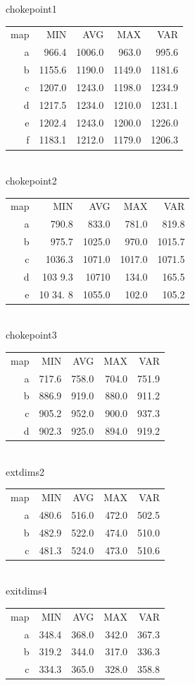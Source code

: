 \documentclass[12pt,letterpaper]{article}
\begin{document}
chokepoint1
\begin{tabular}{ r | r | r | r | r }
map & MIN  & AVG    & MAX    & VAR    \\
a &  966.4 & 1006.0 &  963.0 &  995.6 \\
b & 1155.6 & 1190.0 & 1149.0 & 1181.6 \\
c & 1207.0 & 1243.0 & 1198.0 & 1234.9 \\
d & 1217.5 & 1234.0 & 1210.0 & 1231.1 \\
e & 1202.4 & 1243.0 & 1200.0 & 1226.0 \\
f & 1183.1 & 1212.0 & 1179.0 & 1206.3 \\
\end{tabular}
\\
chokepoint2
\begin{tabular}{ r | r | r | r | r }
map & MIN  & AVG    & MAX    & VAR    \\
a &  790.8 &  833.0 &  781.0 &  819.8 \\
b &  975.7 & 1025.0 &  970.0 & 1015.7 \\
c & 1036.3 & 1071.0 & 1017.0 & 1071.5 \\
d &  103 9.3 & 10710 & 134.0 & 165.5 \\
e & 10 34. 8 & 1055.0& 102.0 & 105.2 \\  
\end{tabular}
\\
chokepoint3
\begin{tabular}{ r | r | r | r | r }
map &  MIN   & AVG   & MAX   & VAR   \\
a   &  717.6 & 758.0 & 704.0 & 751.9 \\
b   &  886.9 & 919.0 & 880.0 & 911.2 \\
c   &  905.2 & 952.0 & 900.0 & 937.3 \\
d   &  902.3 & 925.0 & 894.0 & 919.2 \\
\end{tabular}          
\\  
extdims2
\begin{tabular}{ r | r | r | r | r }
map & MIN   & AVG   & MAX   & VAR   \\
a   & 480.6 & 516.0 & 472.0 & 502.5 \\
b   & 482.9 & 522.0 & 474.0 & 510.0 \\
c   & 481.3 & 524.0 & 473.0 & 510.6 \\
\end{tabular}                          
\\
exitdims4
\begin{tabular}{ r | r | r | r | r }
map & MIN   & AVG   & MAX   & VAR   \\
a   & 348.4 & 368.0 & 342.0 & 367.3 \\
b   & 319.2 & 344.0 & 317.0 & 336.3 \\
c   & 334.3 & 365.0 & 328.0 & 358.8 \\
\end{tabular}
\end{document}
